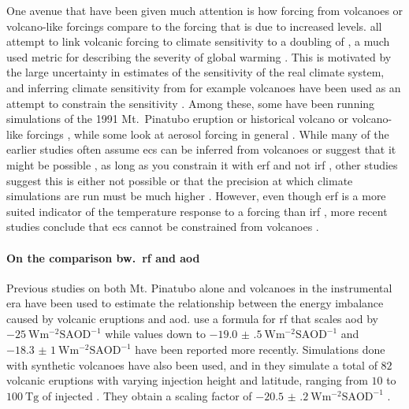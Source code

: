 \documentclass[twocol]{ametsocV5}
\newcommand{\iso}[1][i]{{#1}njected \ce{SO2}}
\begin{document}
One avenue that have been given much attention is how forcing from volcanoes or
volcano-like forcings compare to the forcing that is due to increased  levels.
\citet{boer2007,marvel2016,merlis2014,ollila2016,richardson2019,salvi2022,wigley2005}
all attempt to link volcanic forcing to climate sensitivity to a doubling of , a
much used metric for describing the severity of global warming \citep{marvel2016}. This
is motivated by the large uncertainty in estimates of the sensitivity of the real
climate system, and inferring climate sensitivity from for example volcanoes have been
used as an attempt to constrain the sensitivity \citep{boer2007}. Among these, some have
been running simulations of the 1991 Mt.\ Pinatubo eruption
\citep{merlis2014,ollila2016} or historical volcano or volcano-like forcings
\citep{boer2007,marvel2016,wigley2005}, while some look at aerosol forcing in general
\citep{richardson2019,salvi2022}. While many of the earlier studies often assume
\acrshort{ecs} can be inferred from volcanoes \citep{wigley2005} or suggest that it
might be possible \citep{bender2010}, as long as you constrain it with \acrfull{erf} and
not \acrfull{irf} \citep{richardson2019}, other studies suggest this is either not
possible or that the precision at which climate simulations are run must be much higher
\citep{boer2007,salvi2022}. However, even though \acrshort{erf} is a more suited
indicator of the temperature response to a forcing than \acrshort{irf}
\citep{marvel2016,richardson2019}, more recent studies conclude that \acrshort{ecs}
cannot be constrained from volcanoes \citep{pauling2023}.


\paragraph*{On the comparison bw.\ \acrshort{rf} and \acrshort{aod}}

Previous studies on both Mt. Pinatubo alone \citep{mills2017,hansen2005} and volcanoes
in the instrumental era \citep{gregory2016} have been used to estimate the relationship
between the energy imbalance caused by volcanic eruptions and \acrshort{aod}.
\citet{myhre2013} use a formula for \acrshort{rf} that scales \acrshort{aod} by
\(\SI{-25}{\watt\metre^{-2}\mathrm{SAOD}^{-1}}\) while values down to
\(\SI{-19.0(5)}{\watt\metre^{-2}\mathrm{SAOD}^{-1}}\) \citep{gregory2016} and
\(\SI{-18.3(10)}{\watt\metre^{-2}\mathrm{SAOD}^{-1}}\) \citep{mills2017} have been
reported more recently. Simulations done with synthetic volcanoes have also been used,
and in \citet{marshall2020} they simulate a total of \(82\) volcanic eruptions with
varying injection height and latitude, ranging from \(10\) to \(\SI{100}{\tera\gram}\)
of \iso{}. They obtain a scaling factor of
\(\SI{-20.5(2)}{\watt\metre^{-2}\mathrm{SAOD}^{-1}}\) \citep{marshall2020}.
\end{document}
